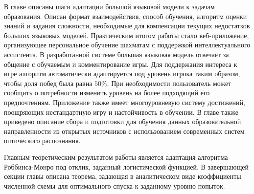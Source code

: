 В главе описаны шаги адаптации большой языковой модели к задачам образования. Описан формат взаимодействия, 
способ обучения, алгоритм оценки знаний и задания сложности, необходимые для компенсации текущих недостатков больших языковых моделей.
Практическим итогом работы стало веб-приложение, организующее персональное обучение шахматам с поддержкой интеллектуального ассистента.
В разработанной системе большая языковая модель отвечает за общение с обучаемым и комментирование игры. Для поддержания интереса к игре алгоритм автоматически 
адаптируется под уровень игрока таким образом, чтобы доля побед была равна $50\%$. При необходимости пользователь 
может сообщить о потребности изменить уровень на более подходящий его предпочтениям. Приложение также имеет многоуровневую систему достижений, поощряющих 
нестандартную игру и настойчивость в обучении. 
В главе также приведено описание сбора и подготовки для обучения данных образовательной направленности из открытых источников с использованием современных
систем оптического распознания. 

Главным теоретическим результатом работы является адаптация алгоритма Роббинса-Монро под отклик, заданный логистической функцией.
В завершающей секции главы описана теорема, задающая в аналитическом виде коэффициенты численной схемы для оптимального 
спуска к заданному уровню попыток. 












